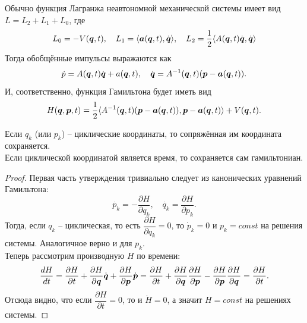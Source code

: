 \begin{note}
    Обычно функция Лагранжа неавтономной механической системы имеет вид $L = L_2 + L_1 + L_0$,
    где \[L_0 = -V(\boldsymbol{q}, t), \quad L_1 = \langle \boldsymbol{a}(\boldsymbol{q}, t), \dot{\boldsymbol{q}} \rangle, \quad L_2 = \dfrac{1}{2}\langle A(\boldsymbol{q}, t)\dot{\boldsymbol{q}}, \dot{\boldsymbol{q}} \rangle\]
    Тогда обобщённые импульсы выражаются как
    \[
        \dot{p} = A(\boldsymbol{q}, t)\dot{\boldsymbol{q}} + a(\boldsymbol{q}, t), \quad \dot{\boldsymbol{q}} = A^{-1}(\boldsymbol{q}, t)(\boldsymbol{p} - \boldsymbol{a}(\boldsymbol{q}, t)).
    \]
    И, соответственно, функция Гамильтона будет иметь вид
    \[
        H(\boldsymbol{q},\boldsymbol{p}, t) = \dfrac{1}{2}\langle A^{-1}(\boldsymbol{q}, t)(\boldsymbol{p} - \boldsymbol{a}(\boldsymbol{q}, t)), \boldsymbol{p} - \boldsymbol{a}(\boldsymbol{q}, t) \rangle + V(\boldsymbol{q}, t).
    \]
\end{note}
\begin{proposition}
    Если $q_k$ (или $p_k$) -- циклические координаты, то сопряжённая им координата сохраняется. \\
    Если циклической координатой является время, то сохраняется сам гамильтониан.
\end{proposition}
\begin{proof}
    Первая часть утверждения тривиально следует из канонических уравнений Гамильтона:
    \[
        \dot{p_k} = -\dfrac{\partial H}{\partial q_k}, \quad \dot{q_k} = \dfrac{\partial H}{\partial p_k}.
    \]
    Тогда, если $q_k$ -- циклическая, то есть $\dfrac{\partial H}{\partial q_k} = 0$, то $\dot{p}_k = 0$ и $p_k = const$ на решения системы.
    Аналогичное верно и для $p_k$. \\
    Теперь рассмотрим производную $H$ по времени:
    \[
        \dfrac{dH}{dt} = \dfrac{\partial H}{\partial t} + \dfrac{\partial H}{\partial \boldsymbol{q}} \dot{\boldsymbol{q}} + \dfrac{\partial H}{\partial \boldsymbol{p}}\dot{\boldsymbol{p}} = \dfrac{\partial H}{\partial t} + \dfrac{\partial H}{\partial \boldsymbol{q}} \dfrac{\partial H}{\partial \boldsymbol{p}} - \dfrac{\partial H}{\partial \boldsymbol{p}} \dfrac{\partial H}{\partial \boldsymbol{q}} = \dfrac{\partial H}{\partial t}.
    \]
    Отсюда видно, что если $\dfrac{\partial H}{\partial t} = 0$, то и $\dot{H} = 0$, а значит $H = const$ на решениях системы.
\end{proof}